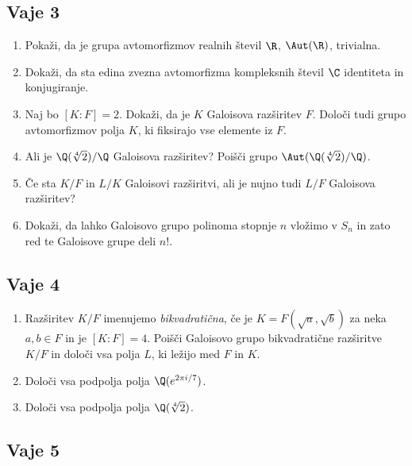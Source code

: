 \subsection*{Vaje 3}

\begin{enumerate}
    \item Pokaži, da je grupa avtomorfizmov realnih števil $\R$, $\Aut(\R)$, trivialna.
    \item Dokaži, da sta edina zvezna avtomorfizma kompleksnih števil $\C$ identiteta in konjugiranje.
    \item Naj bo $[K : F] = 2$. Dokaži, da je $K$ Galoisova razširitev $F$. 
    Določi tudi grupo avtomorfizmov polja $K$, ki fiksirajo vse elemente iz $F$.
    \item Ali je $\Q(\sqrt[4]{2})/\Q$ Galoisova razširitev? 
    Poišči grupo $\Aut(\Q(\sqrt[4]{2})/\Q)$.
    \item Če sta $K/F$ in $L/K$ Galoisovi razširitvi, ali je nujno tudi $L/F$ Galoisova razširitev?
    \item Dokaži, da lahko Galoisovo grupo polinoma stopnje $n$ vložimo v $S_n$ in 
    zato red te Galoisove grupe deli $n!$.
\end{enumerate}

\subsection*{Vaje 4}

\begin{enumerate}
    \item Razširitev $K/F$ imenujemo \emph{bikvadratična}, če je $K = F(\sqrt{a}, \sqrt{b})$ 
    za neka $a, b \in F$ in je $[K:F] = 4$. Poišči Galoisovo grupo bikvadratične razširitve 
    $K/F$ in določi vsa polja $L$, ki ležijo med $F$ in $K$.

    \item Določi vsa podpolja polja $\Q(e^{2\pi i/7})$.
    
    \item Določi vsa podpolja polja $\Q(\sqrt[4]{2})$.
\end{enumerate}

\subsection*{Vaje 5}

